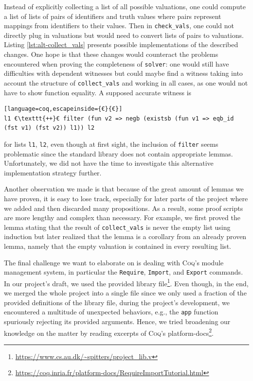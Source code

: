 Instead of explicitly collecting a list of all possible valuations, one could compute a list of lists of pairs of identifiers and truth values where pairs represent mappings from identifiers to their values.
Then in \texttt{check\_vals}, one could not directly plug in valuations but would need to convert lists of pairs to valuations.
Listing \ref{lst:alt-collect_vals} presents possible implementations of the described changes.
One hope is that these changes would counteract the problems encountered when proving the completeness of \texttt{solver}: one would still have difficulties with dependent witnesses but could maybe find a witness taking into account the structure of \texttt{collect\_vals} and working in all cases, as one would not have to show function equality.
A supposed accurate witness is
\begin{lstlisting}[language=coq,escapeinside={€}{€}]
l1 €\texttt{++}€ filter (fun v2 => negb (existsb (fun v1 => eqb_id (fst v1) (fst v2)) l1)) l2
\end{lstlisting}
for lists \texttt{l1}, \texttt{l2}, even though at first sight, the inclusion of \texttt{filter} seems problematic since the standard library does not contain appropriate lemmas.
Unfortunately, we did not have the time to investigate this alternative implementation strategy further.

Another observation we made is that because of the great amount of lemmas we have proven, it is easy to lose track, especially for later parts of the project where we added and then discarded many propositions.
As a result, some proof scripts are more lengthy and complex than necessary.
For example, we first proved the lemma stating that the result of \texttt{collect\_vals} is never the empty list using induction but later realized that the lemma is a corollary from an already proven lemma, namely that the empty valuation is contained in every resulting list. 

The final challenge we want to elaborate on is dealing with \textsc{Coq}'s module management system, in particular the \texttt{Require}, \texttt{Import}, and \texttt{Export} commands.
In our project's draft, we used the provided library file\footnote{\url{https://www.cs.au.dk/~spitters/project_lib.v}}.
Even though, in the end, we merged the whole project into a single file since we only used a fraction of the provided definitions of the library file, during the project's development, we encountered a multitude of unexpected behaviors, e.g., the \texttt{app} function spuriously rejecting its provided arguments.
Hence, we tried broadening our knowledge on the matter by reading excerpts of \textsc{Coq}'s platform-docs\footnote{\url{https://coq.inria.fr/platform-docs/RequireImportTutorial.html}}.
